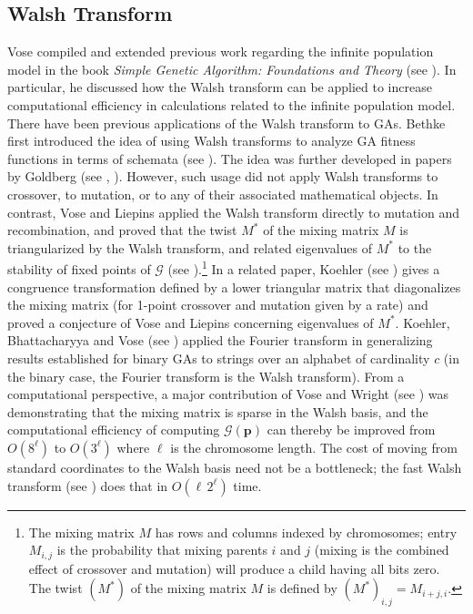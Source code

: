 \subsection{Walsh Transform}
Vose compiled and extended previous work regarding the infinite population model in the book 
\textit{Simple Genetic Algorithm: Foundations and Theory} (see \cite{Vose1999}). 
In particular, he discussed how the Walsh transform can be applied to increase 
computational efficiency in calculations related to the infinite population model. 
There have been previous applications of the Walsh transform to GAs. Bethke first introduced the 
idea of using Walsh transforms to analyze GA fitness functions in terms of schemata (see \cite{Bethke1981}). 
The idea was further developed in papers by Goldberg (see \cite{Goldberg1989a}, \cite{Goldberg1989b}). 
However, such usage did not apply Walsh transforms  to crossover, to mutation, or to any of their 
associated mathematical objects. In contrast, Vose and Liepins applied the Walsh transform directly to mutation and recombination, and proved that the 
twist $M^\ast$ of the mixing matrix $M$ is triangularized by the Walsh transform, and 
related eigenvalues of $M^\ast$ to the stability of fixed points of $\mathcal{G}$ (see \cite{VoseLiepins1991}).\footnote{The mixing 
matrix $M$ has rows and columns indexed by chromosomes; entry $M_{i,j}$ is the probability 
that mixing parents $i$ and $j$ (mixing is the combined effect of crossover and mutation) will produce a 
child having all bits zero. The twist $(M^\ast)$ of the mixing matrix $M$ is defined by $(M^\ast)_{i,j} = M_{i+j, i}$.} 
In a related paper, Koehler (see \cite{Koehler1994}) gives a congruence 
transformation defined by a lower triangular matrix that diagonalizes the mixing matrix (for 1-point crossover and mutation 
given by a rate) and proved a conjecture of Vose and Liepins concerning eigenvalues of $M^\ast$. Koehler, Bhattacharyya 
and Vose (see \cite{KoehlerBhatta1997}) applied the Fourier transform in generalizing results established 
for binary GAs to 
strings over an alphabet of cardinality $c$ (in the binary case, the Fourier transform is the Walsh transform). 
From a computational perspective, a major contribution of Vose and Wright (see \cite{VoseWright1998}) was demonstrating that 
the mixing matrix is sparse in the Walsh basis, and the computational efficiency of 
computing $\mathcal{G}(\bm{p})$ can thereby be improved from 
$O(8^\ell)$ to $O(3^\ell)$ where $\ell$ is the chromosome length. The cost of moving from standard coordinates to the Walsh basis need not be a bottleneck; 
the fast Walsh transform (see \cite{Shanks1969}) does that in $O(\ell \, 2^\ell)$ time.

